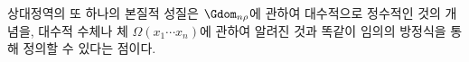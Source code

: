
상대정역의 또 하나의 본질적 성질은 
\glqq{}$\Gdom_{n\rho}$에 관하여 대수적으로 정수적인 것\grqq{}의 개념을, 대수적 수체나 체 $\Omega(x_1\cdots x_n)$에 관하여 알려진 것과 똑같이 임의의 방정식을 통해 정의할 수 있다는 점이다.
